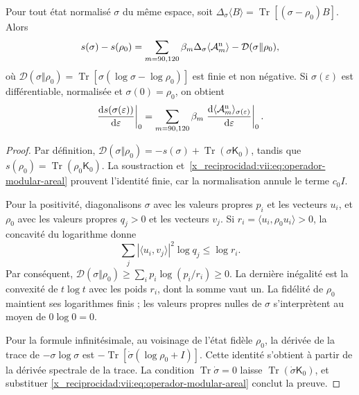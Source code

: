 \begin{theorem}
\label{x_reciprocidad:vii:thm:ley-modular-finita}
Pour tout état normalisé \(\sigma\) du même espace, soit
\(\Delta_\sigma\langle B\rangle
=\operatorname{Tr}[(\sigma-\rho_0)B]\). Alors
\begin{equation}
 s(\sigma)-s(\rho_0)
 =\sum_{m=90,120}\beta_m\Delta_\sigma\langle\mathcal A_m^{\rm n}\rangle
  -\mathcal D(\sigma\Vert\rho_0),
 \label{x_reciprocidad:vii:eq:ley-modular-finita}
\end{equation}
où
\(\mathcal D(\sigma\Vert\rho_0)
=\operatorname{Tr}[\sigma(\log\sigma-\log\rho_0)]\)
est finie et non négative. Si \(\sigma(\varepsilon)\) est différentiable,
normalisée et \(\sigma(0)=\rho_0\), on obtient
\begin{equation}
 \left.\frac{\mathrm ds(\sigma(\varepsilon))}{\mathrm d\varepsilon}\right|_0
 =\sum_{m=90,120}\beta_m
   \left.\frac{\mathrm d\langle\mathcal A_m^{\rm n}\rangle_{
                 \sigma(\varepsilon)}}{\mathrm d\varepsilon}\right|_0.
 \label{x_reciprocidad:vii:eq:primera-ley-modular}
\end{equation}
\end{theorem}
\begin{proof}
Par définition,
\(\mathcal D(\sigma\Vert\rho_0)=-s(\sigma)
+\operatorname{Tr}(\sigma\mathsf K_0)\), tandis que
\(s(\rho_0)=\operatorname{Tr}(\rho_0\mathsf K_0)\).
La soustraction et~\eqref{x_reciprocidad:vii:eq:operador-modular-areal} prouvent l'identité
finie, car la normalisation annule le terme \(c_0I\).

Pour la positivité, diagonalisons \(\sigma\) avec les valeurs propres \(p_i\) et les vecteurs \(u_i\), et \(\rho_0\) avec les valeurs propres \(q_j>0\) et les vecteurs \(v_j\). Si \(r_i=\langle u_i,\rho_0u_i\rangle>0\), la concavité du logarithme donne
\[
 \sum_j|\langle u_i,v_j\rangle|^2\log q_j\le\log r_i.
\]
Par conséquent,
\(\mathcal D(\sigma\Vert\rho_0)
\ge\sum_i p_i\log(p_i/r_i)\ge0\).
La dernière inégalité est la convexité de \(t\log t\) avec les poids
\(r_i\), dont la somme vaut un. La fidélité de \(\rho_0\) maintient
ses logarithmes finis ; les valeurs propres nulles de \(\sigma\)
s'interprètent au moyen de \(0\log0=0\).

Pour la formule infinitésimale, au voisinage de l'état fidèle \(\rho_0\),
la dérivée de la trace de \(-\sigma\log\sigma\) est
\(-\operatorname{Tr}[\dot\sigma(\log\rho_0+I)]\).
Cette identité s'obtient à partir de la dérivée spectrale de la trace.
La condition \(\operatorname{Tr}\dot\sigma=0\) laisse
\(\operatorname{Tr}(\dot\sigma\mathsf K_0)\), et substituer
\eqref{x_reciprocidad:vii:eq:operador-modular-areal} conclut la preuve.
\end{proof}

